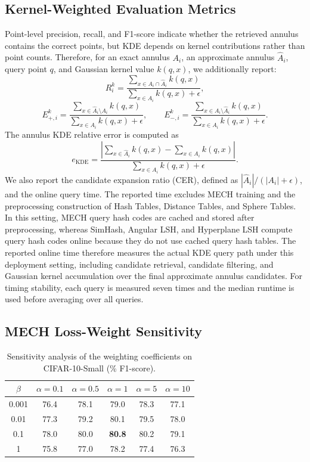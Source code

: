 \documentclass[conference]{IEEEtran}
\begin{document}
\subsection{Kernel-Weighted Evaluation Metrics}
Point-level precision, recall, and F1-score indicate whether the retrieved annulus contains the correct points, but KDE depends on kernel contributions rather than point counts. Therefore, for an exact annulus $A_i$, an approximate annulus $\hat{A}_i$, query point $q$, and Gaussian kernel value $k(q,x)$, we additionally report:
\[
R_i^k = \frac{\sum_{x\in A_i\cap \hat{A}_i} k(q,x)}
{\sum_{x\in A_i} k(q,x)+\epsilon},
\]
\[
E_{+,i}^k = \frac{\sum_{x\in \hat{A}_i\setminus A_i} k(q,x)}
{\sum_{x\in A_i} k(q,x)+\epsilon},\qquad
E_{-,i}^k = \frac{\sum_{x\in A_i\setminus \hat{A}_i} k(q,x)}
{\sum_{x\in A_i} k(q,x)+\epsilon}.
\]
The annulus KDE relative error is computed as
\[
e_{\mathrm{KDE}} =
\frac{\left|\sum_{x\in \hat{A}_i} k(q,x)-\sum_{x\in A_i} k(q,x)\right|}
{\sum_{x\in A_i} k(q,x)+\epsilon}.
\]
We also report the candidate expansion ratio (CER), defined as $|\hat{A}_i|/(|A_i|+\epsilon)$, and the online query time. The reported time excludes MECH training and the preprocessing construction of Hash Tables, Distance Tables, and Sphere Tables. In this setting, MECH query hash codes are cached and stored after preprocessing, whereas SimHash, Angular LSH, and Hyperplane LSH compute query hash codes online because they do not use cached query hash tables. The reported online time therefore measures the actual KDE query path under this deployment setting, including candidate retrieval, candidate filtering, and Gaussian kernel accumulation over the final approximate annulus candidates. For timing stability, each query is measured seven times and the median runtime is used before averaging over all queries.

\subsection{MECH Loss-Weight Sensitivity}
\begin{table}[htbp]
\centering
\caption{Sensitivity analysis of the weighting coefficients on CIFAR-10-Small (\% F1-score).}
\label{tab:sensitivity_cifar10_small}
\begin{tabular}{c|ccccc}
\hline
$\beta$ & $\alpha=0.1$ & $\alpha=0.5$ & $\alpha=1$ & $\alpha=5$ & $\alpha=10$ \\
\hline
0.001 & 76.4 & 78.1 & 79.0 & 78.3 & 77.1 \\
0.01  & 77.3 & 79.2 & 80.1 & 79.5 & 78.0 \\
0.1   & 78.0 & 80.0 & \textbf{80.8} & 80.2 & 79.1 \\
1     & 75.8 & 77.0 & 78.2 & 77.4 & 76.3 \\
\hline
\end{tabular}
\end{table}
\end{document}
